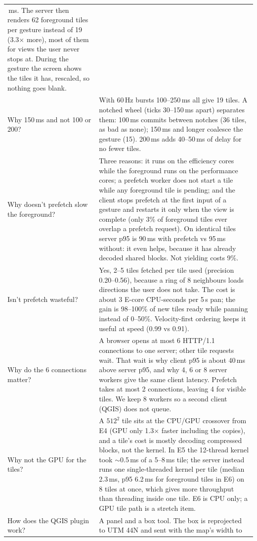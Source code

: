 ﻿\documentclass[11pt,a4paper]{article}
\begin{document}
\begin{longtable}{>{\raggedright\arraybackslash}p{5.2cm}>{\raggedright\arraybackslash}p{10.2cm}}
17\,ms. The server then renders 62 foreground tiles per gesture instead of 19 (3.3$\times$ more), most of them for views the
user never stops at. During the gesture the screen shows the tiles it has, rescaled, so nothing goes blank. \\
Why 150\,ms and not 100 or 200? & With 60\,Hz bursts 100--250\,ms all give 19 tiles. A notched wheel (ticks 30--150\,ms
apart) separates them: 100\,ms commits between notches (36 tiles, as bad as none); 150\,ms and longer coalesce the
gesture (15). 200\,ms adds 40--50\,ms of delay for no fewer tiles. \\
Why doesn't prefetch slow the foreground? & Three reasons: it runs on the efficiency cores while the foreground runs on the
performance cores; a prefetch worker does not start a tile while any foreground tile is pending; and the client stops
prefetch at the first input of a gesture and restarts it only when the view is complete (only 3\% of foreground tiles
ever overlap a prefetch request). On identical tiles server p95 is 90\,ms with prefetch vs 95\,ms without: it even helps,
because it has already decoded shared blocks. Not yielding costs 9\%. \\
Isn't prefetch wasteful? & Yes, 2--5 tiles fetched per tile used (precision 0.20--0.56), because a ring of 8 neighbours
loads directions the user does not take. The cost is about 3 E-core CPU-seconds per 5\,s pan; the gain is 98--100\%
of new tiles ready while panning instead of 0--50\%. Velocity-first ordering keeps it useful at speed (0.99 vs 0.91). \\
Why do the 6 connections matter? & A browser opens at most 6 HTTP/1.1 connections to one server; other tile requests wait.
That wait is why client p95 is about 40\,ms above server p95, and why 4, 6 or 8 server workers give the same client
latency. Prefetch takes at most 2 connections, leaving 4 for visible tiles. We keep 8 workers so a second client (QGIS)
does not queue. \\
Why not the GPU for the tiles? & A $512^2$ tile sits at the CPU/GPU crossover from E4 (GPU only 1.3$\times$ faster
including the copies), and a tile's cost is mostly decoding compressed blocks, not the kernel. In E5 the 12-thread kernel
took $\sim$0.5\,ms of a 5--8\,ms tile; the server instead runs one single-threaded kernel per tile (median 2.3\,ms,
p95 6.2\,ms for foreground tiles in E6) on 8 tiles at once, which gives more throughput than threading inside one
tile. E6 is CPU only; a GPU
tile path is a stretch item. \\
How does the QGIS plugin work? & A panel and a box tool. The box is reprojected to UTM 44N and sent with the map's width to

\end{longtable}
\end{document}
